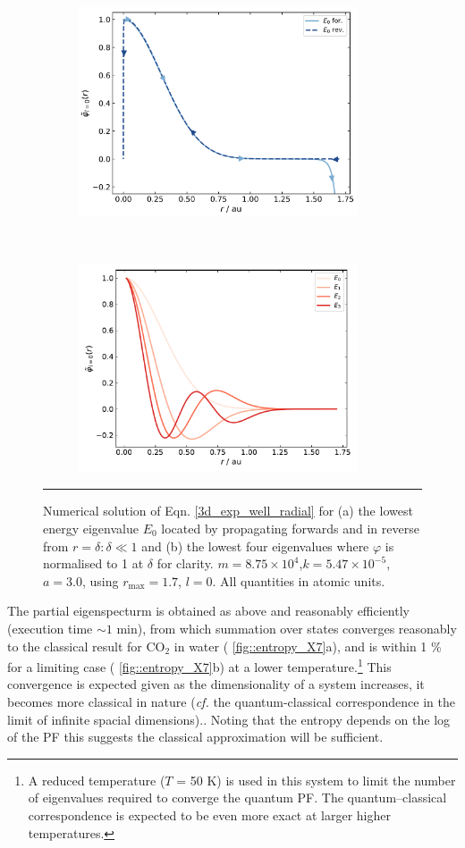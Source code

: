 \documentclass[../main.tex]{subfiles}
\begin{document}
\begin{figure}[h!]
	\begin{subfigure}[t]{0.5\textwidth}
		\centering
		\includegraphics[height=6.2cm]{4/figs/figX6/first_eigenfunction_lines.png}
		\caption{}
	\end{subfigure}%
	~ 
	\begin{subfigure}[t]{0.5\textwidth}
		\centering
		\includegraphics[height=6.2cm]{4/figs/figX6/eigenfunctions.pdf}
		\caption{}
	\end{subfigure}
	\vspace{0.2cm}
	\hrule
	\caption{Numerical solution of Eqn. \eqref{3d_exp_well_radial} for (a) the lowest energy eigenvalue $E_0$ located by propagating forwards and in reverse from $r = \delta : \delta \ll 1$ and (b) the lowest four eigenvalues where $\varphi$ is normalised to 1 at $\delta$ for clarity. $m =8.75 \times 10^4$,$k = 5.47 \times 10^{-5}$, $a = 3.0$, using $r_\text{max} = 1.7$, $l = 0$. All quantities in atomic units.} 
	\label{fig::entropy_X6}
\end{figure}

The partial eigenspecturm is obtained as above and reasonably efficiently (execution time $\sim1$ min), from which summation over states converges reasonably to the classical result for CO$_2$ in water (\figurename{ \ref{fig::entropy_X7}a}), and is within 1 \% for a limiting case (\figurename{ \ref{fig::entropy_X7}b}) at a lower temperature.\footnote{A reduced temperature ($T$ = 50 K) is used in this system to limit the number of  eigenvalues required to converge the quantum PF. The quantum--classical correspondence is expected to be even more exact at larger higher temperatures.} This convergence is expected given as the dimensionality of a system increases, it becomes more classical in nature (\emph{cf.} the quantum-classical correspondence in the limit of infinite spacial dimensions).\cite{QuantClassCorrespondence}. Noting that the entropy depends on the log of the PF this suggests the classical approximation will be sufficient.
\end{document}
